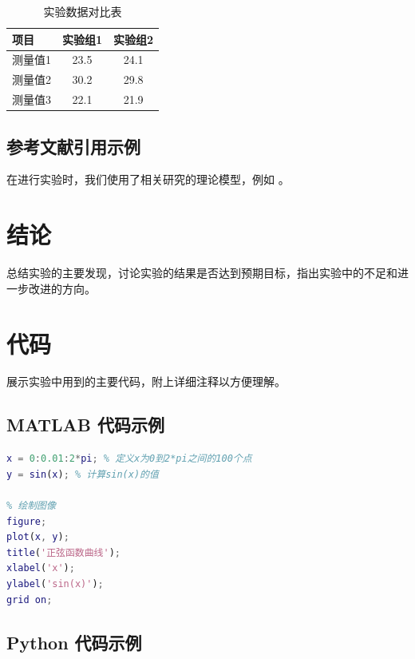 \documentclass[a4paper]{article}
\begin{document}
\begin{table}[H]
    \centering
    \begin{tabular}{l|c|c}
    \toprule
    项目 & 实验组1 & 实验组2 \\
    \midrule
    测量值1 & 23.5 & 24.1 \\
    测量值2 & 30.2 & 29.8 \\
    测量值3 & 22.1 & 21.9 \\
    \bottomrule
    \end{tabular}
    \caption{实验数据对比表}
    \label{tab:comparison}
\end{table}

\subsection{参考文献引用示例}
在进行实验时，我们使用了相关研究的理论模型，例如 \cite{example1}。

\section{结论}

总结实验的主要发现，讨论实验的结果是否达到预期目标，指出实验中的不足和进一步改进的方向。

\appendix
\section{代码}\label{sub:app.code}

展示实验中用到的主要代码，附上详细注释以方便理解。

\subsection{MATLAB 代码示例}

\begin{lstlisting}[language=Matlab, caption={MATLAB 代码示例}, label={code:matlab_example}]
% 这是一个简单的MATLAB代码示例
x = 0:0.01:2*pi; % 定义x为0到2*pi之间的100个点
y = sin(x); % 计算sin(x)的值

% 绘制图像
figure;
plot(x, y);
title('正弦函数曲线');
xlabel('x');
ylabel('sin(x)');
grid on;
\end{lstlisting}

\subsection{Python 代码示例}
\end{document}
